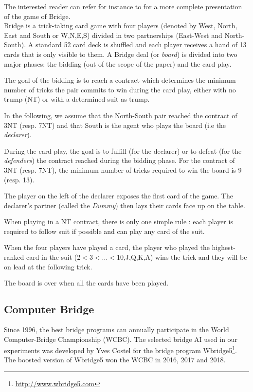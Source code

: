 \documentclass[letterpaper]{article} %
\begin{document}
The interested reader can refer for instance to \cite{mahmood2014bridge} for a more complete presentation of the game of Bridge.\\ 
Bridge is a trick-taking card game with four players (denoted by West, North, East  and South or W,N,E,S)  divided in two partnerships (East-West and  North-South).  A standard 52 card deck is shuffled and each player receives a hand of 13 cards that is only visible to them. A Bridge deal  (or \textit{board}) is divided into two major phases: the bidding (out of the scope of the paper) and the card play.

The goal of the bidding is to reach a contract which determines the minimum number of tricks the pair commits to win during the card play, either with no trump (NT) or with a determined suit as trump.

In the following, we assume that the North-South pair reached the contract of 3NT (resp. 7NT) and that South is the agent who plays the board (i.e the \textit{declarer}).  

During the card play, the goal is to fulfill (for the declarer) or to defeat (for the \textit{defenders}) the contract reached during the bidding phase. For the contract of 3NT (resp. 7NT),  the minimum number of tricks required to win the board is 9 (resp. 13).

The player on the left of the declarer exposes the first card  of the game. The declarer's partner (called the \textit{Dummy}) then lays their cards face up on the table. 

When playing in a NT contract, there is only one simple rule : each player is required to follow suit if possible and  can play any card of the suit.

When the four players have played a card, the player who played the highest-ranked card in the suit  (2$<$3$<$...$<$10,J,Q,K,A)  wins the trick and they will  be on lead at the following trick.

The board is over when all the  cards have been played.

\subsection{Computer Bridge}

Since 1996, the best bridge programs can annually participate in the World Computer-Bridge Championship (WCBC). The selected bridge AI used in our experiments was developed by Yves Costel for the bridge program Wbridge5\footnote{\url{http://www.wbridge5.com}}.
The boosted version of Wbridge5 \cite{ictai2017} won the WCBC in 2016, 2017 and 2018. 
\end{document}
